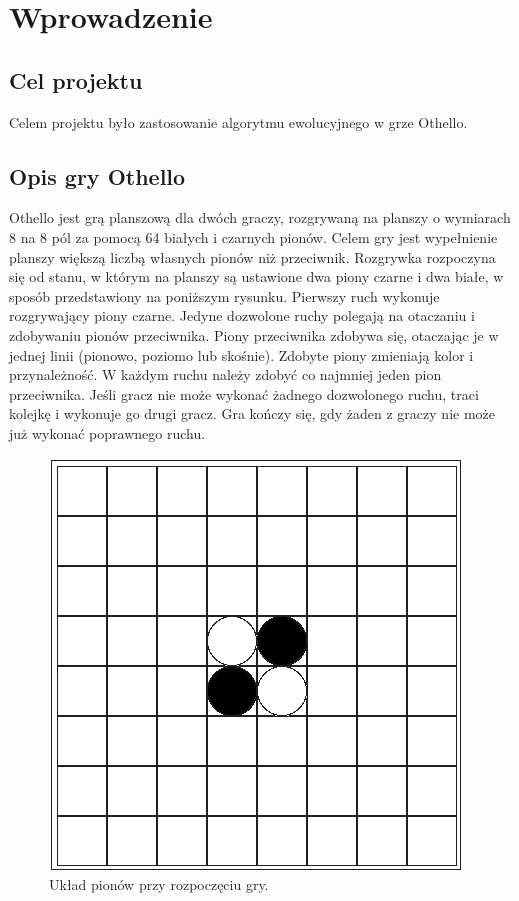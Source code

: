 \section{Wprowadzenie}
\subsection{Cel projektu}
Celem projektu było zastosowanie algorytmu ewolucyjnego w grze Othello.

\subsection{Opis gry Othello}
Othello jest grą planszową dla dwóch graczy, rozgrywaną na planszy o wymiarach 8 na 8 pól za pomocą 64 białych i czarnych pionów. Celem gry jest wypełnienie planszy większą liczbą własnych pionów niż przeciwnik. Rozgrywka rozpoczyna się od stanu, w którym na planszy są ustawione dwa piony czarne i dwa białe, w sposób przedstawiony na poniższym rysunku. Pierwszy ruch wykonuje rozgrywający piony czarne. Jedyne dozwolone ruchy polegają na otaczaniu i zdobywaniu pionów przeciwnika. Piony przeciwnika zdobywa się, otaczając je w jednej linii (pionowo, poziomo lub skośnie). Zdobyte piony zmieniają kolor i przynależność. W każdym ruchu należy zdobyć co najmniej jeden pion przeciwnika. Jeśli gracz nie może wykonać żadnego dozwolonego ruchu, traci kolejkę i wykonuje go drugi gracz. Gra kończy się, gdy żaden z graczy nie może już wykonać poprawnego ruchu.
\begin{figure}[h!]
\centering
\includegraphics[scale=0.5]{img/othello_start.png}
\caption{Układ pionów przy rozpoczęciu gry.} 
\end{figure}
